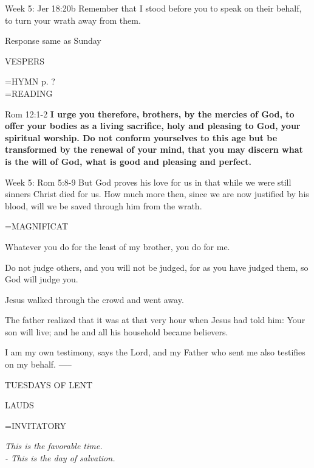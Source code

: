 Week 5:    Jer 18:20b    Remember that I stood before you to speak on their behalf, to turn your wrath away from them.

Response same as Sunday

\begin{flushleft}\normalsize VESPERS\\\end{flushleft}
\hangindent=\parindent \small{\uppercase{HYMN} p.  ?\\}
\hangindent=\parindent \small READING
\begin{description}[labelindent=\parindent, leftmargin=*]
\item [Weeks 1-4:]      Rom 12:1-2 \textbf{     I urge you therefore, brothers, by the mercies of God, to offer your bodies as a living sacrifice, holy and pleasing to God, your spiritual worship. Do not conform yourselves to this age but be transformed by the renewal of your mind, that you may discern what is the will of God, what is good and pleasing and perfect.}
\end{description}

Week 5:     Rom 5:8-9     But God proves his love for us in that while we were still sinners Christ died for us. How much more then, since we are now justified by his blood, will we be saved through him from the wrath.

\hangindent=\parindent \small MAGNIFICAT
\begin{description}[labelindent=\parindent, noitemsep, leftmargin=*]
\item [Week 1:] 	Whatever you do for the least of my brother, you do for me.
\item [Week 2:] 	Do not judge others, and you will not be judged, for as you have judged them, so God will judge you.
\item [Week 3:] 	Jesus walked through the crowd and went away.
\item [Week 4:] 	The father realized that it was at that very hour when Jesus had told him: Your son will live; and he and all his household became believers.
\item [Week 5:] 	I am my own testimony, says the Lord, and my Father who sent me also testifies on my behalf.
-----
\begin{center}
\normalsize TUESDAYS OF LENT
\end{center}
\end{description}

\begin{flushleft}\normalsize LAUDS\\\end{flushleft}
\hangindent=\parindent \small{INVITATORY}
\begin{center}
\textit{This is the favorable time.\\}
\textit{- This is the day of salvation.\\}
\end{center}

